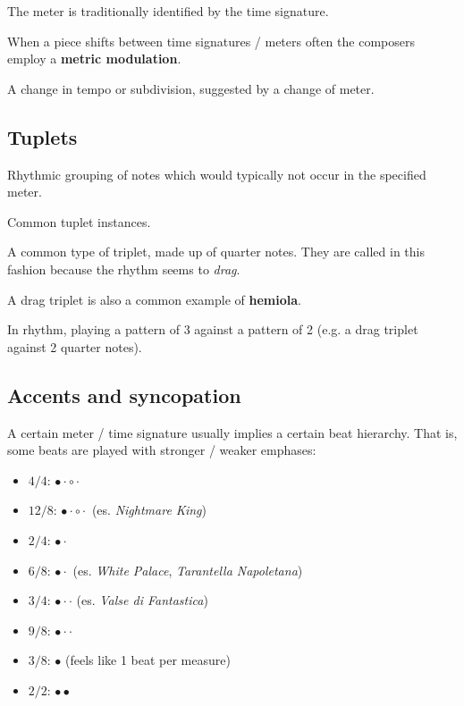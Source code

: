 The meter is traditionally identified by the time signature.

When a piece shifts between time signatures / meters often the composers employ a \textbf{metric modulation}.

\begin{definition}
    A change in tempo or subdivision, suggested by a change of meter.
\end{definition}

\subsection{Tuplets}
\begin{definition}[Tuplet]
    Rhythmic grouping of notes which would typically not occur in the specified meter.
\end{definition}

\begin{definition}
    Common tuplet instances.
\end{definition}

\begin{definition}
    A common type of triplet, made up of quarter notes. They are called in this fashion because the rhythm seems to \emph{drag}.
\end{definition}

A drag triplet is also a common example of \textbf{hemiola}.

\begin{definition}
    In rhythm, playing a pattern of 3 against a pattern of 2 (e.g. a drag triplet against 2 quarter notes).
\end{definition}

\subsection{Accents and syncopation}
A certain meter / time signature usually implies a certain beat hierarchy. That is, some beats are played with stronger / weaker emphases:
\begin{itemize}
    \item $4/4$: $\bullet \cdot \circ \cdot$
    \item $12/8$: $\bullet \cdot \circ \cdot$ (es. \emph{Nightmare King})
    \item $2/4$: $\bullet \cdot$
    \item $6/8$: $\bullet \cdot$ (es. \emph{White Palace}, \emph{Tarantella Napoletana})
    \item $3/4$: $\bullet \cdot \cdot$ (es. \emph{Valse di Fantastica})
    \item $9/8$: $\bullet \cdot \cdot$
    \item $3/8$: $\bullet$ (feels like 1 beat per measure)
    \item $2/2$: $\bullet \bullet$
\end{itemize}

